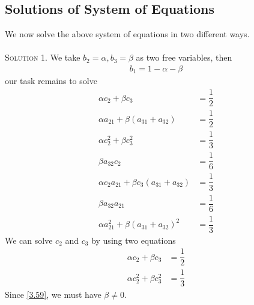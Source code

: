 \documentclass[a4paper,oneside]{book}
\numberwithin{equation}{chapter}
\begin{document}
\subsection{Solutions of System of Equations}
We now solve the above system of equations in two different ways.\\
\\
\textsc{Solution 1.} We take $b_2=\alpha,b_3=\beta$ as two free variables, then 
\begin{align}
{b_1} = 1 - \alpha  - \beta 
\end{align}
our task remains to solve
\begin{align}
\alpha {c_2} + \beta {c_3} &= \dfrac{1}{2}\\
\alpha {a_{21}} + \beta \left( {{a_{31}} + {a_{32}}} \right) &= \dfrac{1}{2}\\
\alpha c_2^2 + \beta c_3^2 &= \dfrac{1}{3}\\
\beta {a_{32}}{c_2}& = \dfrac{1}{6}\label{3.57}\\
\alpha {c_2}{a_{21}} + \beta {c_3}\left( {{a_{31}} + {a_{32}}} \right) &= \dfrac{1}{3}\\
\beta {a_{32}}{a_{21}} &= \dfrac{1}{6}\label{3.59}\\
\alpha a_{21}^2 + \beta {\left( {{a_{31}} + {a_{32}}} \right)^2} &= \dfrac{1}{3}
\end{align}
We can solve $c_2$ and $c_3$ by using two equations
\begin{align}
\alpha {c_2} + \beta {c_3} &= \dfrac{1}{2}\label{3.61}\\
\alpha c_2^2 + \beta c_3^2 &= \dfrac{1}{3}\label{3.62}
\end{align}
Since \eqref{3.59}, we must have $\beta \ne 0$.
\end{document}
